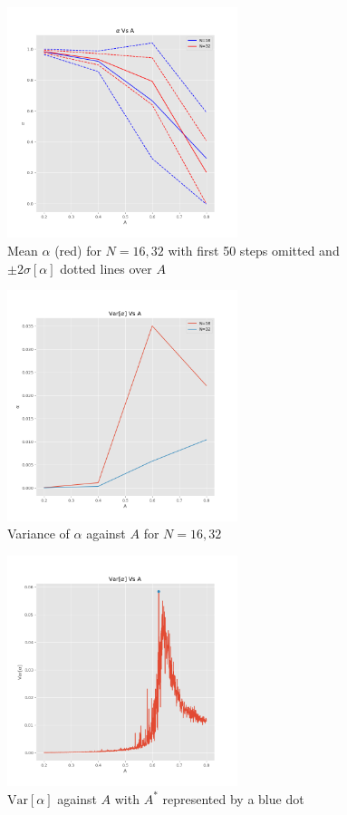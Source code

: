 \documentclass{article}
\begin{document}
\begin{figure}[h!]
\centering

\includegraphics[width=0.6\textwidth]{alphaMean.png}
\caption{Mean $\alpha$ (red) for $N=16,32$ with first 50 steps omitted and $\pm2\sigma[\alpha]$ dotted lines over $A$}
\label{fig2}
\end{figure}

\begin{figure}[h!]
\centering

\includegraphics[width=0.6\textwidth]{alphaVar.png}
\caption{Variance of $\alpha$ against $A$ for $N=16,32$}
\label{fig3}
\end{figure}

\begin{figure}[h!]
\centering

\includegraphics[width=0.6\textwidth]{rate.png}
\caption{$\mathrm{Var}[\alpha]$ against $A$ with $A^{*}$ represented by a blue dot}
\label{fig4}
\end{figure}
\end{document}
